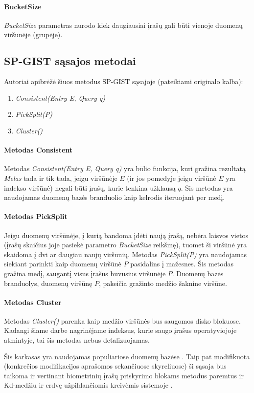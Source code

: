 \paragraph{BucketSize}
{\it BucketSize} parametras nurodo kiek daugiausiai įrašų gali būti vienoje duomenų viršūnėje (grupėje).



\subsection{SP-GIST sąsajos metodai}

Autoriai apibrėžė šiuos metodus SP-GIST sąsajoje (pateikiami originalo kalba):
\begin{enumerate}
	\item {\it Consistent(Entry E, Query q)}
	\item {\it PickSplit(P)}
	\item {\it Cluster()}
\end{enumerate}

\paragraph{Metodas Consistent}
Metodas {\it Consistent(Entry E, Query q)} yra būlio funkcija, kuri gražina rezultatą {\it Melas} tada ir tik tada, jeigu viršūnėje $E$ (ir jos pomedyje jeigu viršūnė $E$ yra indekso viršūnė) negali būti įrašų, kurie tenkina užklausą $q$.
Šis metodas yra naudojamas duomenų bazės branduolio kaip kelrodis iteruojant per medį.

\paragraph{Metodas PickSplit}
Jeigu duomenų viršūnėje, į kurią bandoma įdėti naują įrašą, nebėra laisvos vietos (įrašų skaičius joje pasiekė parametro {\it BucketSize} reikšmę), tuomet ši viršūnė yra skaidoma į dvi ar daugiau naujų viršūnių.
Metodas {\it PickSplit(P)} yra naudojamas siekiant parinkti kaip duomenų viršūnė $P$ pasidalins į mažesnes.
Šis metodas gražina medį, saugantį visus įrašus buvusius viršūnėje $P$.
Duomenų bazės branduolys, duomenų viršūnę $P$, pakeičia gražinto medžio šaknine viršūne.

\paragraph{Metodas Cluster}
Metodas {\it Cluster()} parenka kaip medžio viršūnės bus saugomos disko blokuose.
Kadangi šiame darbe nagrinėjame indeksus, kurie saugo įrašus operatyviojoje atmintyje, tai šis metodas nebus detalizuojamas.

Šis karkasas yra naudojamas populiariose duomenų bazėse \cite{eltabakh2006space}.
Taip pat modifikuota (konkrečios modifikacijos aprašomos sekančiuose skyreliuose) ši sąsaja bus taikoma ir vertinant biometrinių įrašų priskyrimo blokams metodus paremtus ir Kd-medžiu ir erdvę užpildančiomis kreivėmis sistemoje \cite{NeurotechnologyMegamatcherAccelerator}.


